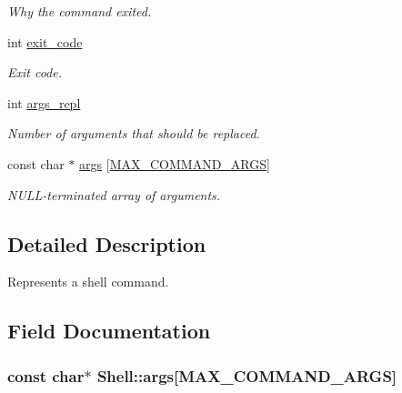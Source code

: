\begin{DoxyCompactItemize}
\begin{DoxyCompactList}\small\item\em Why the command exited. \end{DoxyCompactList}\item 
\hypertarget{structShell_a6d3a37fb42f08d96c562d7d05eacd293}{}int \hyperlink{structShell_a6d3a37fb42f08d96c562d7d05eacd293}{exit\+\_\+code}\label{structShell_a6d3a37fb42f08d96c562d7d05eacd293}

\begin{DoxyCompactList}\small\item\em Exit code. \end{DoxyCompactList}\item 
\hypertarget{structShell_af96a946fda6d42272f3922506300b470}{}int \hyperlink{structShell_af96a946fda6d42272f3922506300b470}{args\+\_\+repl}\label{structShell_af96a946fda6d42272f3922506300b470}

\begin{DoxyCompactList}\small\item\em Number of arguments that should be replaced. \end{DoxyCompactList}\item 
const char $\ast$ \hyperlink{structShell_a5c11ff22f0e7d22527ce3f40812adb2c}{args} \mbox{[}\hyperlink{shell_8h_a0ad0666a1726541270e5b2a3594f242c}{M\+A\+X\+\_\+\+C\+O\+M\+M\+A\+N\+D\+\_\+\+A\+R\+G\+S}\mbox{]}
\begin{DoxyCompactList}\small\item\em N\+U\+L\+L-\/terminated array of arguments. \end{DoxyCompactList}\end{DoxyCompactItemize}


\subsection{Detailed Description}
Represents a shell command. 

\subsection{Field Documentation}
\hypertarget{structShell_a5c11ff22f0e7d22527ce3f40812adb2c}{}
\subsubsection[{args}]{\setlength{\rightskip}{0pt plus 5cm}const char$\ast$ Shell\+::args\mbox{[}{\bf M\+A\+X\+\_\+\+C\+O\+M\+M\+A\+N\+D\+\_\+\+A\+R\+G\+S}\mbox{]}}\label{structShell_a5c11ff22f0e7d22527ce3f40812adb2c}


